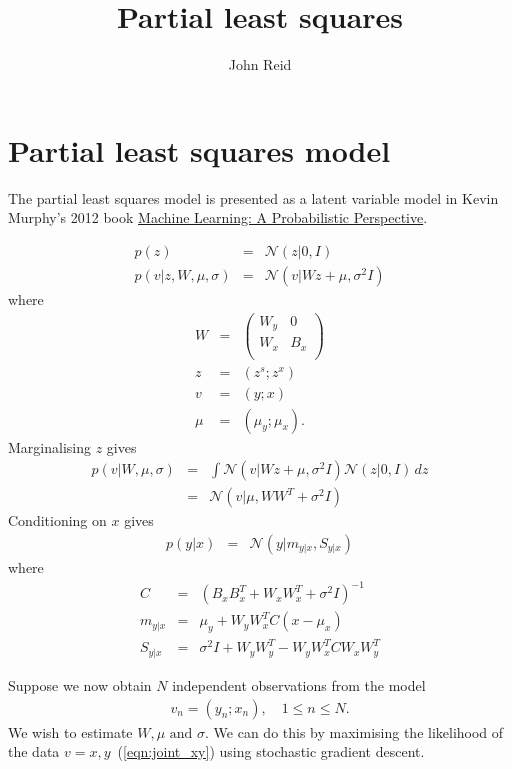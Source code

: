 \documentclass{article}
\title{Partial least squares}
\author{John Reid}
\begin{document}
\section{Partial least squares model}

The partial least
squares model is presented as a latent variable model in Kevin Murphy's 2012
book \href{https://probml.github.io/pml-book/}{Machine Learning: A
Probabilistic Perspective}.

\begin{eqnarray}
  p(z) &=& \mathcal{N}(z|0, I) \\
  p(v|z, W, \mu, \sigma) &=& \mathcal{N}(v|W z + \mu, \sigma^2 I)
\end{eqnarray}
where
\begin{eqnarray}
  W &=& \begin{pmatrix}
      W_y & 0 \\
      W_x & B_x \\
    \end{pmatrix} \\
  z &=& (z^s; z^x) \\
  v &=& (y; x) \\
  \mu &=& (\mu_y; \mu_x).
\end{eqnarray}
Marginalising $z$ gives
\begin{eqnarray}
  p(v|W, \mu, \sigma)
  &=& \int \mathcal{N}(v|W z + \mu, \sigma^2 I) \mathcal{N}(z|0, I)\,dz \\
  \label{eqn:joint_xy}
  &=& \mathcal{N}(v|\mu, W W^T + \sigma^2 I)
\end{eqnarray}
Conditioning on $x$ gives
\begin{eqnarray}
  p(y|x) &=& \mathcal{N}(y|m_{y|x}, S_{y|x})
\end{eqnarray}
where
\begin{eqnarray}
  C &=& {(B_x B_x^T + W_x W_x^T + \sigma^2 I)}^{-1} \\
  m_{y|x} &=& \mu_y + W_y W_x^T C (x - \mu_x) \\
  S_{y|x} &=& \sigma^2 I + W_y W_y^T - W_y W_x^T C W_x W_y^T
\end{eqnarray}

Suppose we now obtain $N$ independent observations from the model
\begin{eqnarray}
  v_n = (y_n; x_n),\quad 1 \le n \le N.
\end{eqnarray}
We wish to estimate $W, \mu \text{ and } \sigma$. We can do this by maximising the likelihood of the data
$v = x, y$~(\ref{eqn:joint_xy}) using stochastic gradient descent.
\end{document}
